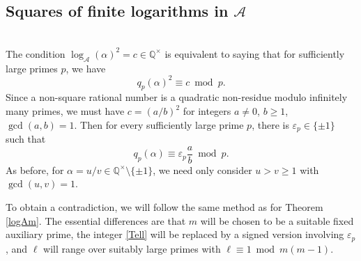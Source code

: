 \documentclass[10pt,a4paper]{amsart}
\newcommand{\cA}{\mathcal A}
\begin{document}
\subsection{Squares of finite logarithms in $\cA$} $\,$\\[3pt]
The condition $\log_\cA(\alpha)^2=c\in\mathbb{Q}^\times$ is equivalent to saying that for sufficiently large primes $p$, we have
\[q_p(\alpha)^2\equiv c\bmod p.\]
Since a non-square rational number is a quadratic non-residue modulo infinitely many primes, we must have $c=(a/b)^2$ for integers $a\neq 0$, $b\geq 1$, $\gcd(a,b)=1$. Then for every sufficiently large prime $p$, there is $\varepsilon_p\in\{\pm 1\}$ such that
\[q_p(\alpha)\equiv \varepsilon_p\frac{a}{b}\bmod p.\]
As before, for $\alpha=u/v\in\mathbb{Q}^\times\setminus\{\pm 1\}$, we need only consider $u>v\geq 1$ with $\gcd(u,v)=1$.
\smallskip

To obtain a contradiction, we will follow the same method as for Theorem \ref{logAm}. The essential differences are that $m$ will be chosen to be a suitable fixed auxiliary prime, the integer \eqref{Tell} will be replaced by a signed version involving $\varepsilon_p$, and $\ell$ will range over suitably large primes with $\ell\equiv 1\bmod m(m-1)$.
\end{document}
